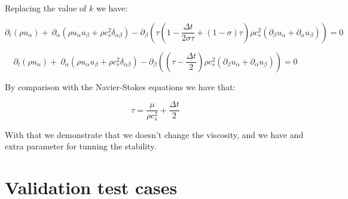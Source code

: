 \documentclass{article}
\begin{document}
Replacing the value of $k$ we have:

\begin{equation*}
    \partial _{t}( \rho u_{\alpha }) +\ \partial _{\alpha }\left( \rho u_{\alpha } u_{\beta } +\rho c_{s}^{2} \delta _{\alpha \beta }\right) -\partial _{\beta }\left( \tau \left( 1-\frac{\Delta t}{2\sigma\tau} + (1-\sigma)\tau\right) \rho c_{s}^{2}( \partial _{\beta } u_{\alpha } +\partial _{\alpha } u_{\beta })\right) = 0
\end{equation*}

\begin{equation*}
    \partial _{t}( \rho u_{\alpha }) +\ \partial _{\alpha }\left( \rho u_{\alpha } u_{\beta } +\rho c_{s}^{2} \delta _{\alpha \beta }\right) -\partial _{\beta }\left(  \left( \tau-\frac{\Delta t}{2}\right) \rho c_{s}^{2}( \partial _{\beta } u_{\alpha } +\partial _{\alpha } u_{\beta })\right) = 0
\end{equation*}

By comparison with the Navier-Stokes equations we have that:

\begin{equation}
    \tau =\frac{\mu }{\rho c_{s}^{2}} +\frac{\Delta t}{2}
\end{equation}

With that we demonstrate that we doesn't change the viscosity, and we have and extra parameter for tunning the stability.
\section{Validation test cases}
\end{document}
